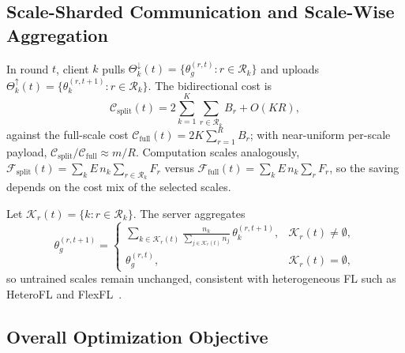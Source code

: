 \documentclass[sigconf]{acmart}
\begin{document}
\subsection{Scale-Sharded Communication and Scale-Wise Aggregation}

In round $t$, client $k$ pulls
$\Theta_{k}^{\downarrow}(t)=\{\theta_g^{(r,t)}:r\in\mathcal{R}_k\}$ and uploads
$\Theta_{k}^{\uparrow}(t)=\{\theta_k^{(r,t+1)}:r\in\mathcal{R}_k\}$. The
bidirectional cost is
\begin{equation}
\mathcal{C}_{\mathrm{split}}(t)
=2\sum_{k=1}^{K}\sum_{r\in\mathcal{R}_k}B_r + O(KR),
\end{equation}
against the full-scale cost $\mathcal{C}_{\mathrm{full}}(t)=2K\sum_{r=1}^{R}B_r$;
with near-uniform per-scale payload,
$\mathcal{C}_{\mathrm{split}}/\mathcal{C}_{\mathrm{full}}\approx m/R$.
Computation scales analogously,
$\mathcal{F}_{\mathrm{split}}(t)=\sum_{k}E\,n_k\sum_{r\in\mathcal{R}_k}F_r$ versus
$\mathcal{F}_{\mathrm{full}}(t)=\sum_{k}E\,n_k\sum_{r}F_r$, so the saving depends
on the cost mix of the selected scales.

Let $\mathcal{K}_r(t)=\{k:r\in\mathcal{R}_k\}$. The server aggregates
\begin{equation}
\theta_g^{(r,t+1)}=
\begin{cases}
\displaystyle
\sum_{k\in\mathcal{K}_r(t)}
\frac{n_k}{\sum_{j\in\mathcal{K}_r(t)}n_j}\,
\theta_k^{(r,t+1)}, & \mathcal{K}_r(t)\neq\emptyset,\\[2ex]
\theta_g^{(r,t)}, & \mathcal{K}_r(t)=\emptyset,
\end{cases}
\label{eq:scale-agg}
\end{equation}
so untrained scales remain unchanged, consistent with heterogeneous FL such as
HeteroFL and FlexFL~\cite{heterofl,flexfl}.

\subsection{Overall Optimization Objective}
\label{sec:overall-obj}
\end{document}

